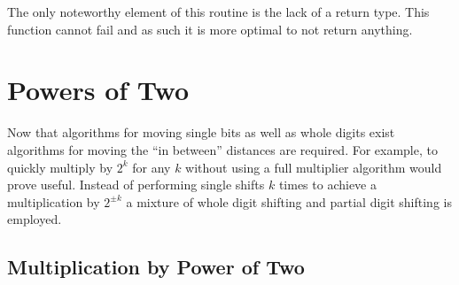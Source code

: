 \documentclass[b5paper]{book}
\begin{document}
The only noteworthy element of this routine is the lack of a return type.  This function cannot fail and as such it is more optimal to not
return anything.

\section{Powers of Two}

Now that algorithms for moving single bits as well as whole digits exist algorithms for moving the ``in between'' distances are required.  For 
example, to quickly multiply by $2^k$ for any $k$ without using a full multiplier algorithm would prove useful.  Instead of performing single
shifts $k$ times to achieve a multiplication by $2^{\pm k}$ a mixture of whole digit shifting and partial digit shifting is employed.  

\subsection{Multiplication by Power of Two}
\end{document}

